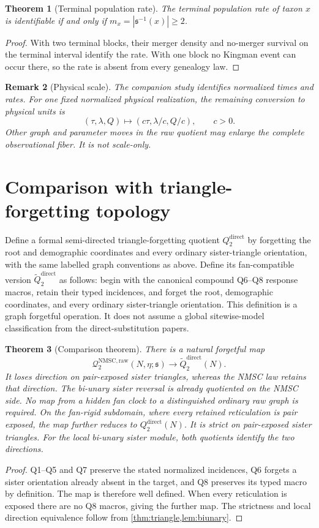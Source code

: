 \documentclass[11pt]{article}
\newtheorem{theorem}{Theorem}[section]
\newtheorem{remark}[theorem]{Remark}
\newcommand{\Qraw}{\mathcal Q^{\mathrm{NMSC,raw}}_2}
\newcommand{\Qdirect}{Q^{\mathrm{direct}}_2}
\begin{document}
\begin{theorem}[Terminal population rate]
\label{thm:terminal}
The terminal population rate of taxon $x$ is identifiable if and only if $m_x=|\mathfrak s^{-1}(x)|\ge2$.
\end{theorem}

\begin{proof}
With two terminal blocks, their merger density and no-merger survival on the terminal interval identify the rate.  With one block no Kingman event can occur there, so the rate is absent from every genealogy law.
\end{proof}

\begin{remark}[Physical scale]
The companion study \citep{KriebelNMSCCore2026} identifies normalized times and rates.  For one fixed normalized physical realization, the remaining conversion to physical units is
\[
 (\tau,\lambda,Q)\mapsto(c\tau,\lambda/c,Q/c),\qquad c>0.
\]
Other graph and parameter moves in the raw quotient may enlarge the complete
observational fiber.  It is not scale-only.
\end{remark}

\section{Comparison with triangle-forgetting topology}
\label{sec:comparison}
Define a formal semi-directed triangle-forgetting quotient $\Qdirect$ by
forgetting the root and demographic coordinates and every ordinary
sister-triangle orientation, with the same labelled graph conventions as
above.  Define its fan-compatible version $\widetilde\Qdirect$ as follows: begin
with the canonical compound Q6--Q8 response macros, retain their typed incidences, and
forget the root, demographic coordinates, and every ordinary sister-triangle
orientation.  This definition is a graph forgetful operation.  It does not
assume a global sitewise-model classification from the direct-substitution
papers.

\begin{theorem}[Comparison theorem]
\label{thm:comparison}
There is a natural forgetful map
\[
 \Qraw(N,\eta;\mathfrak s)\longrightarrow\widetilde\Qdirect(N).
\]
It loses direction on pair-exposed sister triangles, whereas the NMSC law
retains that direction.  The bi-unary sister reversal is already quotiented
on the NMSC side.  No map from a hidden fan clock to a distinguished ordinary
raw graph is required.
On the fan-rigid subdomain, where every retained reticulation is pair exposed,
the map further reduces to $\Qdirect(N)$.  It is strict on pair-exposed sister
triangles.  For the local bi-unary sister module, both quotients identify
the two directions.
\end{theorem}
\begin{proof}
Q1--Q5 and Q7 preserve the stated normalized incidences, Q6 forgets a
sister orientation already absent in the target, and Q8 preserves its typed
macro by definition.  The map is therefore well defined.  When every
reticulation is exposed there are no Q8 macros, giving the further map.
The strictness and local direction equivalence follow from
\cref{thm:triangle,lem:biunary}.
\end{proof}
\end{document}
